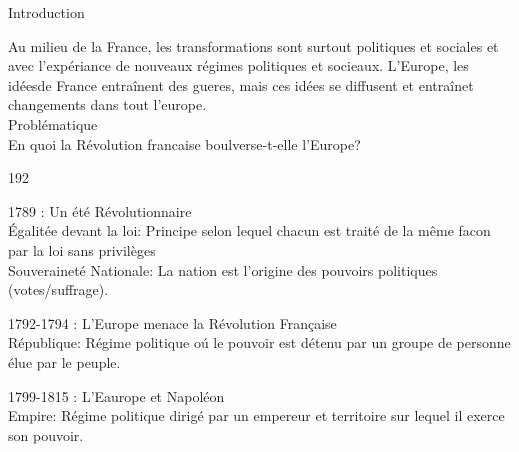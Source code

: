 \documentclass[12pt,a4paper]{article}
\begin{document}
\begin{center}
        \shadowbox{\begin{large}
                \textcolor{black}{L'europe boulversée par la révolution Fran\c caise $(1789-1815)$}
        \end{large}}
    \end{center}
    \vspace{0.5 cm}
Introduction \\ \par
	Au milieu de la France, les transformations sont surtout politiques et sociales et avec l'expériance de nouveaux régimes politiques et socieaux.
	L'Europe, les idéesde France entra\^inent des gueres, mais ces idées se diffusent et entra\^inet changements dans tout l'europe. \\

 Problématique \\
\textcolor{greeen}{En quoi la Révolution francaise boulverse-t-elle l'Europe?}


\begin{dingautolist}{192}

\item 1789 : Un été Révolutionnaire \\ 
\'Egalitée devant la loi: Principe selon lequel chacun est traité de la même facon par la loi sans privilèges \\
Souveraineté Nationale: La nation est l'origine des pouvoirs politiques (votes/suffrage).

\item 1792-1794 : L'Europe menace la Révolution Fran\c caise \\
République: Régime politique o\'u le pouvoir est détenu par un groupe de personne élue par le peuple.

\item 1799-1815 : L'Eaurope et Napoléon \\
Empire: Régime politique dirigé par un empereur et territoire sur lequel il exerce son pouvoir.

\end{dingautolist}
\end{document}
